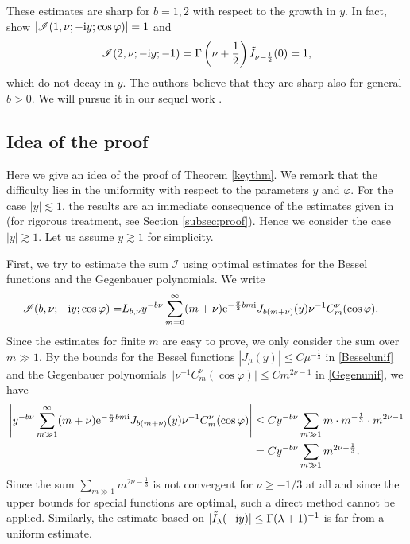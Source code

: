 \documentclass[10pt,a4paper]{amsart}
\numberwithin{equation}{section}
\def\f{\varphi}
\def\m{\mu}
\def\n{\nu}
\newcommand{\sI}{\mathscr{I}}
\begin{document}
\begin{Remark}\label{dispremark}
These estimates are sharp for $b=1,2$ with respect to the growth in $y$. In fact, \cite[equations~(4.45), (4,46)]{BKO} show $|\sI(1,\nu;-{\rm i}y;\cos\f)|=1$ and
\[
\sI(2,\nu;-{\rm i}y;-1)=\Gamma\left(\n+\frac{1}{2}\right)\tilde{I}_{\n-\frac{1}{2}}(0)=1,
\]
 which do not decay in $y$. The authors believe that they are sharp also for general $b>0$. We will pursue it in our sequel work \cite{TT}.
\end{Remark}

\subsection{Idea of the proof}

Here we give an idea of the proof of Theorem \ref{keythm}. We remark that the difficulty lies in the uniformity with respect to the parameters $y$ and $\f$. For the case $|y|\lesssim 1$, the results are an immediate consequence of the estimates given in \cite{BKO} (for rigorous treatment, see Section \ref{subsec:proof}). Hence we consider the case $|y|\gtrsim 1$. Let us assume $y\gtrsim 1$ for simplicity.

First, we try to estimate the sum $\sI$ using optimal estimates for the Bessel functions and the Gegenbauer polynomials. We write
\begin{align*}
\sI(b,\nu;- {\rm i}y;\cos\f)=&L_{b,\n}y^{-b\n}\sum_{m=0}^{\infty}(m+\nu){\rm e}^{-\frac{\pi}{2}bm {\rm i}}J_{b(m+\n)}(y)\n^{-1}C^{\nu}_m(\cos\f).
\end{align*}
Since the estimates for finite $m$ are easy to prove, we only consider the sum over $m\gg 1$.
By the bounds for the Bessel functions $|J_{\m}(y)|\leq C\m^{-\frac{1}{3}}$ in \eqref{Besselunif} and the Gegenbauer polynomials~${\big|\n^{-1}C_m^{\n}(\cos \f)\big|\leq Cm^{2\n-1}}$ in \eqref{Gegenunif}, we have
\begin{align*}
\left|y^{-b\n}\sum_{m\gg 1}^{\infty}(m+\nu){\rm e}^{-\frac{\pi}{2}bm {\rm i}}J_{b(m+\n)}(y)\n^{-1}C^{\nu}_m(\cos\f)\right|\leq{}& Cy^{-b\n}\sum_{m\gg 1}m\cdot m^{-\frac{1}{3}}\cdot m^{2\n-1}\\
={}&Cy^{-b\n}\sum_{m\gg 1}m^{2\n-\frac{1}{3}}.
\end{align*}
Since the sum $\sum_{m\gg 1}m^{2\n-\frac{1}{3}}$ is not convergent for $\n\ge -1/3$ at all and since the upper bounds for special functions are optimal, such a direct method cannot be applied. Similarly, the estimate based on %
$|\tilde{I}_{\lambda}(-{\rm i}y)|\le \Gamma(\lambda+1)^{-1}$
is far from a uniform estimate.
\end{document}
